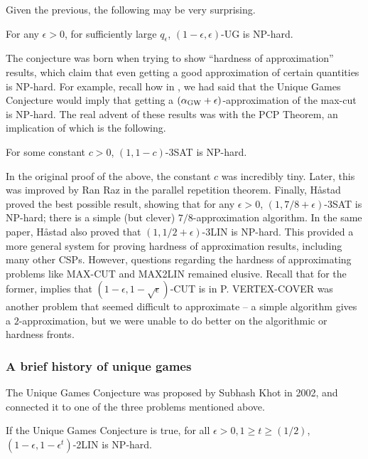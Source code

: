 		Given the previous, the following may be very surprising.
		\begin{fcon}
			For any $\epsilon > 0$, for sufficiently large $q_{\epsilon}$, $(1-\epsilon,\epsilon)$-UG is \textsf{NP}-hard.
		\end{fcon}
		The conjecture was born when trying to show ``hardness of approximation'' results, which claim that even getting a good approximation of certain quantities is \textsf{NP}-hard. For example, recall how in , we had said that the Unique Games Conjecture would imply that getting a $(\alpha_{\text{GW}}+\epsilon)$-approximation of the max-cut is \textsf{NP}-hard. The real advent of these results was with the PCP Theorem, an implication of which is the following.

		\begin{theorem}
			For some constant $c > 0$, $(1,1-c)$-3SAT is \textsf{NP}-hard.
		\end{theorem}
		In the original proof of the above, the constant $c$ was incredibly tiny. Later, this was improved by Ran Raz \cite{raz-parallel-reptn} in the parallel repetition theorem. Finally, H\r{a}stad \cite{hastad-appx-3sat} proved the best possible result, showing that for any $\epsilon > 0$, $(1,7/8 + \epsilon)$-3SAT is \textsf{NP}-hard; there is a simple (but clever) $7/8$-approximation algorithm. In the same paper, H\r{a}stad also proved that $(1,1/2+\epsilon)$-3LIN is \textsf{NP}-hard. This provided a more general system for proving hardness of approximation results, including many other CSPs. However, questions regarding the hardness of approximating problems like MAX-CUT and MAX2LIN remained elusive. Recall that for the former,  implies that $(1-\epsilon,1-\sqrt{\epsilon})$-CUT is in \textsf{P}. VERTEX-COVER was another problem that seemed difficult to approximate -- a simple algorithm gives a $2$-approximation, but we were unable to do better on the algorithmic or hardness fronts.

	\subsubsection{A brief history of unique games}

		The Unique Games Conjecture was proposed by Subhash Khot \cite{ugc-og} in 2002, and connected it to one of the three problems mentioned above.

		\begin{theorem}[Khot]
			If the Unique Games Conjecture is true, for all $\epsilon > 0, 1 \ge t \ge (1/2)$, $(1-\epsilon,1-\epsilon^t)$-2LIN is \textsf{NP}-hard.
		\end{theorem}

